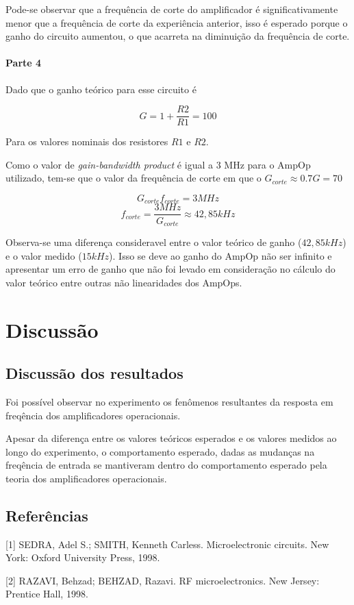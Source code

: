 \documentclass{abntex2}
\begin{document}
Pode-se observar que a frequência de corte do amplificador é significativamente menor que a frequência de corte da experiência anterior, isso é esperado porque o ganho do circuito aumentou, o que acarreta na diminuição da frequência de corte.

\subsubsection{Parte 4}

Dado que o ganho teórico para esse circuito é

\[G = 1+\frac{R2}{R1} = 100\]

Para os valores nominais dos resistores $R1$ e $R2$.

Como o valor de \emph{gain-bandwidth product} é igual a 3 MHz para o AmpOp utilizado, tem-se que o valor da frequência de corte em que o $G_{corte} \approx 0.7 G = 70$

\[G_{corte}f_{corte} = 3MHz\]
\[f_{corte} = \frac{3MHz}{G_{corte}} \approx 42,85kHz\]

Observa-se uma diferença consideravel entre o valor teórico de ganho ($42,85 kHz$) e o valor medido ($15 kHz$). Isso se deve ao ganho do AmpOp não ser infinito e apresentar um erro de ganho que não foi levado em consideração no cálculo do valor teórico entre outras não linearidades dos AmpOps.


\chapter{Discussão}

\section{Discussão dos resultados}

Foi possível observar no experimento os fenômenos resultantes da resposta em freqência dos amplificadores operacionais.

Apesar da diferença entre os valores teóricos esperados e os valores medidos ao longo do experimento, o comportamento esperado, dadas as mudanças na freqência de entrada se mantiveram dentro do comportamento esperado pela teoria dos amplificadores operacionais.

\clearpage

\section*{Referências}

[1] SEDRA, Adel S.; SMITH, Kenneth Carless. Microelectronic circuits. New York: Oxford University Press, 1998.

[2] RAZAVI, Behzad; BEHZAD, Razavi. RF microelectronics. New Jersey: Prentice Hall, 1998.
\end{document}
